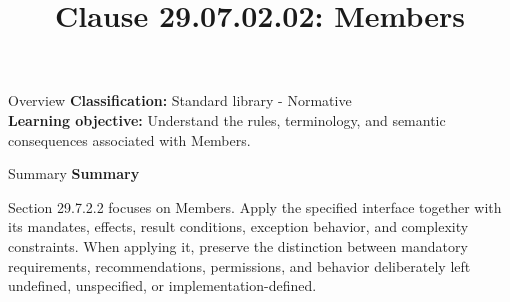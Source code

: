\documentclass[10pt,letterpaper]{article}
\title{Clause 29.07.02.02: Members}
\author{}
\date{}
\begin{document}
\maketitle
\begin{CornellOverviewBox}{Overview}
\textbf{Classification:} Standard library - Normative\\[2pt]
\textbf{Learning objective:} Understand the rules, terminology, and semantic consequences associated with Members.
\end{CornellOverviewBox}\begin{CornellSummaryBox}{Summary}
{\sffamily\bfseries\color{Accent} Summary}\par\vspace{3pt}Section 29.7.2.2 focuses on Members. Apply the specified interface together with its mandates, effects, result conditions, exception behavior, and complexity constraints. When applying it, preserve the distinction between mandatory requirements, recommendations, permissions, and behavior deliberately left undefined, unspecified, or implementation-defined.
\end{CornellSummaryBox}
\end{document}
